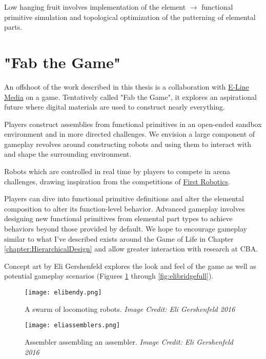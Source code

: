 {Low hanging fruit involves implementation of the element $\rightarrow$ functional primitive simulation and topological optimization of the patterning of elemental parts.


\section{"Fab the Game"}

An offshoot of the work described in this thesis is a collaboration with \href{http://elinemedia.com/}{E-Line Media} on a game.  Tentatively called "Fab the Game", it explores an aspirational future where digital materials are used to construct nearly everything.  

Players construct assemblies from functional primitives in an open-ended sandbox environment and in more directed challenges.  We envision a large component of gameplay revolves around constructing robots and using them to interact with and shape the surrounding environment.


Robots which are controlled in real time by players to compete in arena challenges, drawing inspiration from the competitions of \href{http://www.firstinspires.org/robotics/frc}{First Robotics}.


Players can dive into functional primitive definitions and alter the elemental composition to alter its function-level behavior.  Advanced gameplay involves designing new functional primitives from elemental part types to achieve behaviors beyond those provided by default.  We hope to encourage gameplay similar to what I've described exists around the Game of Life in Chapter \ref{chapter:HierarchicalDesign} and allow greater interaction with research at CBA.

Concept art by Eli Gershenfeld explores the look and feel of the game as well as potential gameplay scenarios (Figures \ref{fig:elibendy} through \ref{fig:elibridgefull}).

\begin{figure}
  \texttt{[image: elibendy.png]}
  \caption{A swarm of locomoting robots.  \textit{Image Credit: Eli Gershenfeld 2016}}
  \label{fig:elibendy}
\end{figure}

\begin{figure}
  \texttt{[image: eliassemblers.png]}
  \caption{Assembler assembling an assembler.  \textit{Image Credit: Eli Gershenfeld 2016}}
  \label{fig:eliassemblers}
\end{figure}

}
